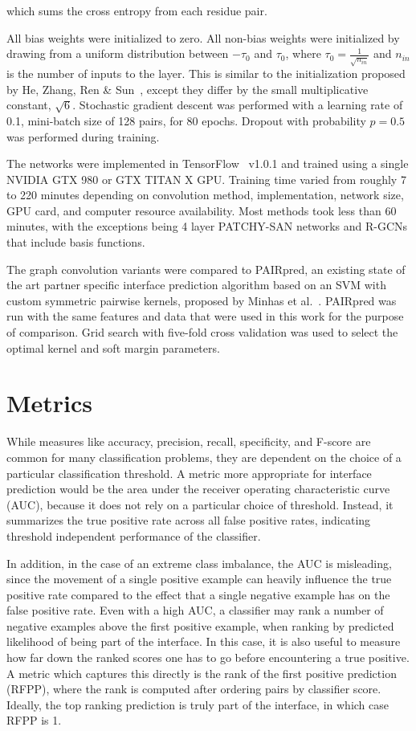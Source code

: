 \noindent
which sums the cross entropy from each residue pair.


All bias weights were initialized to zero.
All non-bias weights were initialized by drawing from a uniform distribution between $-\tau_0$ and $\tau_0$, where $\tau_0=\frac{1}{\sqrt{n_{in}}}$ and $n_{in}$ is the number of inputs to the layer.
This is similar to the initialization proposed by He, Zhang, Ren \& Sun~\cite{he2015}, except they differ by the small multiplicative constant, $\sqrt{6}$.
Stochastic gradient descent was performed with a learning rate of 0.1, mini-batch size of 128 pairs, for 80 epochs.
Dropout with probability $p=0.5$ was performed during training.

The networks were implemented in TensorFlow~\cite{abadi2015} v1.0.1 and trained using a single NVIDIA GTX 980 or GTX TITAN X GPU.
Training time varied from roughly 7 to 220 minutes depending on convolution method, implementation, network size, GPU card, and computer resource availability.
Most methods took less than 60 minutes, with the exceptions being 4 layer PATCHY-SAN networks and R-GCNs that include basis functions.


The graph convolution variants were compared to PAIRpred, an existing state of the art partner specific interface prediction algorithm based on an SVM with custom symmetric pairwise kernels, proposed by Minhas et al.~\cite{minhas2014}.
PAIRpred was run with the same features and data that were used in this work for the purpose of comparison.
Grid search with five-fold cross validation was used to select the optimal kernel and soft margin parameters.



\section{Metrics}

While measures like accuracy, precision, recall, specificity, and F-score are common for many classification problems, they are dependent on the choice of a particular classification threshold.
A metric more appropriate for interface prediction would be the area under the receiver operating characteristic curve (AUC), because it does not rely on a particular choice of threshold.
Instead, it summarizes the true positive rate across all false positive rates, indicating threshold independent performance of the classifier.

In addition, in the case of an extreme class imbalance, the AUC is misleading, since the movement of a single positive example can heavily influence the true positive rate compared to the effect that a single negative example has on the false positive rate.
Even with a high AUC, a classifier may rank a number of negative examples above the first positive example, when ranking by predicted likelihood of being part of the interface.
In this case, it is also useful to measure how far down the ranked scores one has to go before encountering a true positive.
A metric which captures this directly is the rank of the first positive prediction (RFPP), where the rank is computed after ordering pairs by classifier score.
Ideally, the top ranking prediction is truly part of the interface, in which case RFPP is 1.

